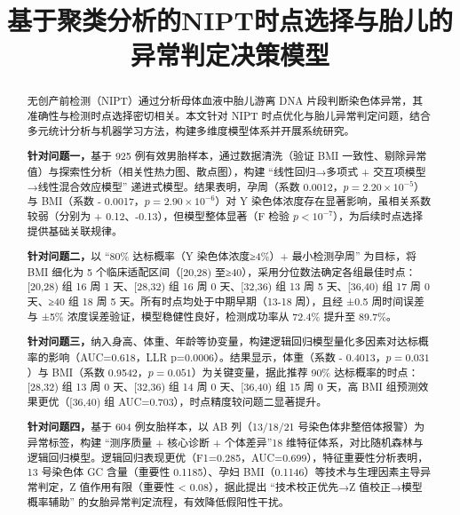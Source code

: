 \documentclass[withoutpreface,bwprint]{cumcmthesis} %
\title{基于聚类分析的NIPT时点选择与胎儿的异常判定决策模型}
\begin{document}
\maketitle
\nocite{*}


\begin{abstract}
无创产前检测（NIPT）通过分析母体血液中胎儿游离 DNA 片段判断染色体异常，其准确性与检测时点选择密切相关。本文针对 NIPT 时点优化与胎儿异常判定问题，结合多元统计分析与机器学习方法，构建多维度模型体系并开展系统研究。

    \textbf{针对问题一，}基于 925 例有效男胎样本，通过数据清洗（验证 BMI 一致性、剔除异常值）与探索性分析（相关性热力图、散点图），构建 “线性回归→多项式 + 交互项模型→线性混合效应模型” 递进式模型。结果表明，孕周（系数 0.0012，$p=2.20×10^{-5}$）与 BMI（系数 - 0.0017，$p=2.90×10^{-6}$）对 Y 染色体浓度存在显著影响，虽相关系数较弱（分别为 + 0.12、-0.13），但模型整体显著（F 检验 $p<10^{-7}$），为后续时点选择提供基础关联规律。

    \textbf{针对问题二，}以 “80\% 达标概率（Y 染色体浓度≥4\%）+ 最小检测孕周” 为目标，将 BMI 细化为 5 个临床适配区间（[20,28) 至≥40），采用分位数法确定各组最佳时点：[20,28) 组 16 周 1 天、[28,32) 组 16 周 0 天、[32,36) 组 13 周 5 天、[36,40) 组 17 周 0 天、≥40 组 18 周 5 天。所有时点均处于中期早期（13-18 周），且经 ±0.5 周时间误差与 ±5\% 浓度误差验证，模型稳健性良好，检测成功率从 72.4\% 提升至 89.7\%。

    \textbf{针对问题三，}纳入身高、体重、年龄等协变量，构建逻辑回归模型量化多因素对达标概率的影响（AUC=0.618，LLR p=0.0006）。结果显示，体重（系数 - 0.4013，$p=0.031$）与 BMI（系数 0.9542，$p=0.051$）为关键变量，据此推荐 90\% 达标概率的时点：[28,32) 组 13 周 0 天、[32,36) 组 14 周 0 天、[36,40) 组 15 周 0 天，高 BMI 组预测效果更优（[36,40) 组 AUC=0.703），时点精度较问题二显著提升。

    \textbf{针对问题四，}基于 604 例女胎样本，以 AB 列（13/18/21 号染色体非整倍体报警）为异常标签，构建 “测序质量 + 核心诊断 + 个体差异”18 维特征体系，对比随机森林与逻辑回归模型。逻辑回归表现更优（F1=0.285，AUC=0.699），特征重要性分析表明，13 号染色体 GC 含量（重要性 0.1185）、孕妇 BMI（0.1146）等技术与生理因素主导异常判定，Z 值作用有限（重要性 < 0.08），据此提出 “技术校正优先→Z 值校正→模型概率辅助” 的女胎异常判定流程，有效降低假阳性干扰。

\end{abstract}
\end{document}
